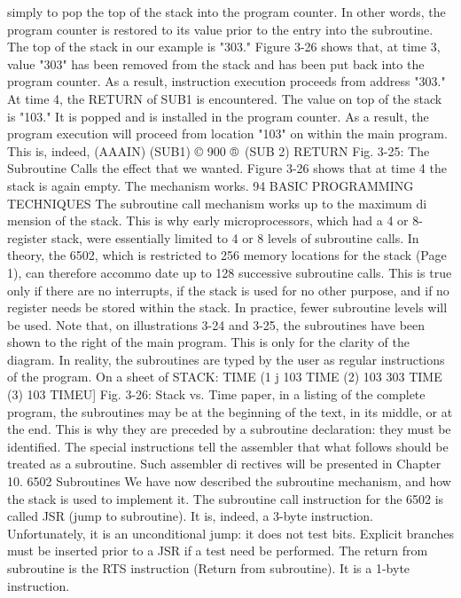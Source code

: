 simply to pop the top of the stack into the program counter. In
other words, the program counter is restored to its value prior to
the entry into the subroutine. The top of the stack in our example
is "303." Figure 3-26 shows that, at time 3, value "303" has been
removed from the stack and has been put back into the program
counter. As a result, instruction execution proceeds from address
"303." At time 4, the RETURN of SUB1 is encountered. The value
on top of the stack is "103." It is popped and is installed in the
program counter. As a result, the program execution will proceed
from location "103" on within the main program. This is, indeed,
(AAAIN)
(SUB1)
© 900
®\
(SUB 2)
RETURN
Fig. 3-25: The Subroutine Calls
the effect that we wanted. Figure 3-26 shows that at time 4 the
stack is again empty. The mechanism works.
94
BASIC PROGRAMMING TECHNIQUES
The subroutine call mechanism works up to the maximum di
mension of the stack. This is why early microprocessors, which
had a 4 or 8-register stack, were essentially limited to 4 or 8 levels
of subroutine calls. In theory, the 6502, which is restricted to 256
memory locations for the stack (Page 1), can therefore accommo
date up to 128 successive subroutine calls. This is true only if
there are no interrupts, if the stack is used for no other purpose,
and if no register needs be stored within the stack. In practice,
fewer subroutine levels will be used.
Note that, on illustrations 3-24 and 3-25, the subroutines
have been shown to the right of the main program. This is only for
the clarity of the diagram. In reality, the subroutines are typed by
the user as regular instructions of the program. On a sheet of
STACK: TIME (1 j
103
TIME (2)
103
303
TIME (3)
103
TIMEU]
Fig. 3-26: Stack vs. Time
paper, in a listing of the complete program, the subroutines may
be at the beginning of the text, in its middle, or at the end. This is
why they are preceded by a subroutine declaration: they must be
identified. The special instructions tell the assembler that what
follows should be treated as a subroutine. Such assembler di
rectives will be presented in Chapter 10.
6502 Subroutines
We have now described the subroutine mechanism, and how the
stack is used to implement it. The subroutine call instruction for
the 6502 is called JSR (jump to subroutine). It is, indeed, a 3-byte
instruction. Unfortunately, it is an unconditional jump: it does not
test bits. Explicit branches must be inserted prior to a JSR if a
test need be performed.
The return from subroutine is the RTS instruction (Return
from subroutine). It is a 1-byte instruction.
